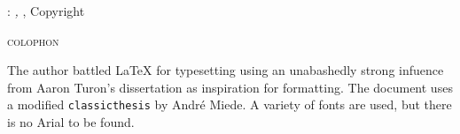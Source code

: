 \thispagestyle{empty}

\hfill

\vfill

\begingroup
\begin{wide}
    \begin{center}
        \noindent\myName: \textit{\myTitle,} \mySubtitle, %
        Copyright \textcopyright\ \myTime
    \end{center}
\end{wide}
\endgroup

\vfill

\noindent\textsc{colophon}
\medskip

\noindent The author battled \LaTeX\xspace for typesetting using an unabashedly strong infuence from Aaron
Turon's dissertation
as inspiration for formatting. The document uses a modified \texttt{classicthesis} by
André Miede. A variety of fonts are used, but there is no Arial to be found.
%
%
%
%
%

